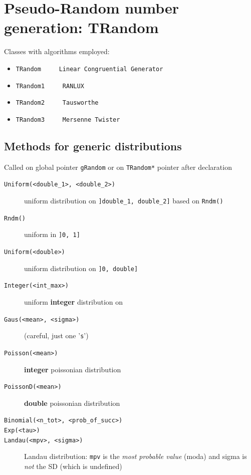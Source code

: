 \documentclass[10pt, twoside]{article}
\newcommand{\ttt}[1]{\colorbox{boxgray}{\texttt{#1}}}
\begin{document}
\section{Pseudo-Random number generation: TRandom}
Classes with algorithms employed:
\begin{itemize}
\item \texttt{TRandom \, \dotfill \, Linear Congruential Generator}
\begin{center}
\end{center}
\item \texttt{TRandom1 \, \dotfill \, RANLUX}
\item \texttt{TRandom2 \, \dotfill \, Tausworthe}
\item \texttt{TRandom3 \, \dotfill \, Mersenne Twister}
\end{itemize}
\subsection{Methods for generic distributions}
Called on global pointer \ttt{gRandom} or on \ttt{TRandom*} pointer after declaration
\begin{description}
\item[\ttt{Uniform(<double\_1>, <double\_2>)}] uniform distribution on \ttt{\big]double\_1, double\_2\big]} based on \ttt{Rndm()}
\item[\ttt{Rndm()}] uniform in \ttt{\big]0, 1\big]}
\item[\ttt{Uniform(<double>)}] uniform distribution on \ttt{\big]0, double\big]}
\item[\ttt{Integer(<int\_max>)}] uniform \textbf{integer} distribution on \ttt{}
\item[\ttt{Gaus(<mean>, <sigma>)}] (careful, just one '\ttt{s}')
\item[\ttt{Poisson(<mean>)}] \textbf{integer} poissonian distribution
\item[\ttt{PoissonD(<mean>)}] \textbf{double} poissonian distribution
\item[\ttt{Binomial(<n\_tot>, <prob\_of\_succ>)}]
\item[\ttt{Exp(<tau>)}]
\item[\ttt{Landau(<mpv>, <sigma>)}] Landau distribution: \ttt{mpv} is the \textit{most probable value} (moda) and sigma is \textit{not} the SD (which is undefined)
\end{description}
\end{document}
